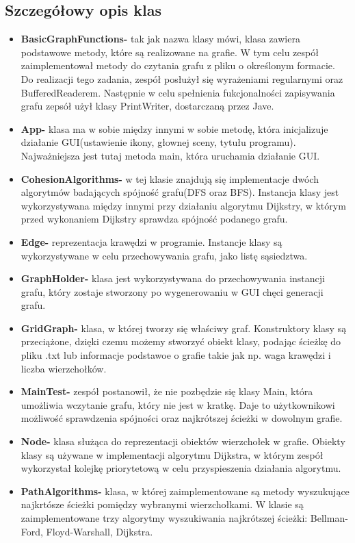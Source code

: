 \documentclass[10pt]{article}
\begin{document}
\subsection{Szczegółowy opis klas}
\begin{itemize}
    \item \textbf{BasicGraphFunctions-} tak jak nazwa klasy mówi, klasa zawiera podstawowe metody, które są realizowane na grafie. W tym celu zespół zaimplementował metody do czytania grafu z pliku o określonym formacie. Do realizacji tego zadania, zespół posłużył się wyrażeniami regularnymi oraz BufferedReaderem. Następnie w celu spełnienia fukcjonalności zapisywania grafu zepsół użył klasy PrintWriter, dostarczaną przez Jave.
    \item \textbf{App-} klasa ma w sobie między innymi w sobie metodę, która inicjalizuje działanie GUI(ustawienie ikony, głownej sceny, tytułu programu). Najważniejsza jest tutaj metoda main, która uruchamia działanie GUI.
    \item \textbf{CohesionAlgorithms-} w tej klasie znajdują się implementacje dwóch algorytmów badających spójność grafu(DFS oraz BFS). Instancja klasy jest wykorzystywana między innymi przy działaniu algorytmu Dijkstry, w którym przed wykonaniem Dijkstry sprawdza spójność podanego grafu.
    \item \textbf{Edge-} reprezentacja krawędzi w programie. Instancje klasy są wykorzystywane w celu przechowywania grafu, jako listę sąsiedztwa.  
    \item \textbf{GraphHolder-} klasa jest wykorzystywana do przechowywania instancji grafu, który zostaje stworzony po wygenerowaniu w GUI chęci generacji grafu.
    \item \textbf{GridGraph-} klasa, w której tworzy się właściwy graf. Konstruktory klasy są przeciążone, dzięki czemu możemy stworzyć obiekt klasy, podając ścieżkę do pliku .txt lub informacje podstawoe o grafie takie jak np. waga krawędzi i liczba wierzchołków.
    \item \textbf{MainTest-} zespół postanowił, że nie pozbędzie się klasy Main, która umożliwia wczytanie grafu, który nie jest w kratkę. Daje to użytkownikowi możliwość sprawdzenia spójności oraz najkrótszej ścieżki w dowolnym grafie.
    \item \textbf{Node-} klasa służąca do reprezentacji obiektów wierzchołek w grafie. Obiekty klasy są używane w implementacji algorytmu Dijkstra, w którym zespół wykorzystał kolejkę priorytetową w celu przyspieszenia działania algorytmu.
    \item \textbf{PathAlgorithms-} klasa, w której zaimplementowane są metody wyszukujące najkrtósze ścieżki pomiędzy wybranymi wierzchołkami. W klasie są zaimplementowane trzy algorytmy wyszukiwania najkrótszej ścieżki: Bellman-Ford, Floyd-Warshall, Dijkstra.

\end{itemize}
\end{document}
